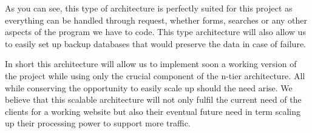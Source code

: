 As you can see, this type of architecture is perfectly suited for this
project as everything can be handled through request, whether forms, searches
or any other aspects of the program we have to code. This type architecture will
also allow us to easily set up backup databases that would preserve the
data in case of failure. \newline

In short this architecture will allow us to implement soon a working
version of the project while using only the crucial component of the n-tier
architecture. All while conserving the opportunity to easily scale up
should the need arise. We believe that this scalable architecture will not
only fulfil the current need of the clients for a working website but also
their eventual future need in term scaling up their processing power to
support more traffic.
